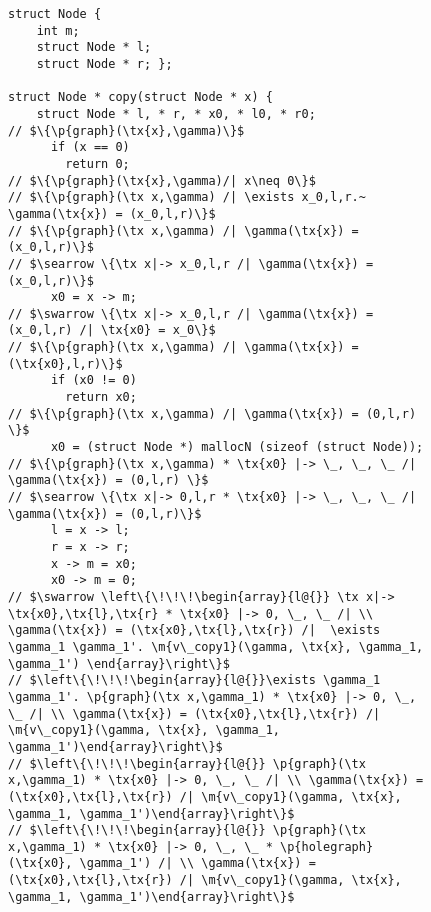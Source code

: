 \begin{figure}
  \begin{lstlisting}
struct Node {
    int m;
    struct Node * l;
    struct Node * r; };

struct Node * copy(struct Node * x) { 
    struct Node * l, * r, * x0, * l0, * r0;
// $\{\p{graph}(\tx{x},\gamma)\}$
      if (x == 0)
        return 0;
// $\{\p{graph}(\tx{x},\gamma)/| x\neq 0\}$
// $\{\p{graph}(\tx x,\gamma) /| \exists x_0,l,r.~ \gamma(\tx{x}) = (x_0,l,r)\}$
// $\{\p{graph}(\tx x,\gamma) /| \gamma(\tx{x}) = (x_0,l,r)\}$
// $\searrow \{\tx x|-> x_0,l,r /| \gamma(\tx{x}) = (x_0,l,r)\}$
      x0 = x -> m;
// $\swarrow \{\tx x|-> x_0,l,r /| \gamma(\tx{x}) = (x_0,l,r) /| \tx{x0} = x_0\}$
// $\{\p{graph}(\tx x,\gamma) /| \gamma(\tx{x}) = (\tx{x0},l,r)\}$
      if (x0 != 0)
        return x0;
// $\{\p{graph}(\tx x,\gamma) /| \gamma(\tx{x}) = (0,l,r) \}$
      x0 = (struct Node *) mallocN (sizeof (struct Node));
// $\{\p{graph}(\tx x,\gamma) * \tx{x0} |-> \_, \_, \_ /| \gamma(\tx{x}) = (0,l,r) \}$
// $\searrow \{\tx x|-> 0,l,r * \tx{x0} |-> \_, \_, \_ /| \gamma(\tx{x}) = (0,l,r)\}$
      l = x -> l;
      r = x -> r;
      x -> m = x0;
      x0 -> m = 0;
// $\swarrow \left\{\!\!\!\begin{array}{l@{}} \tx x|-> \tx{x0},\tx{l},\tx{r} * \tx{x0} |-> 0, \_, \_ /| \\ \gamma(\tx{x}) = (\tx{x0},\tx{l},\tx{r}) /|  \exists \gamma_1 \gamma_1'. \m{v\_copy1}(\gamma, \tx{x}, \gamma_1, \gamma_1') \end{array}\right\}$
// $\left\{\!\!\!\begin{array}{l@{}}\exists \gamma_1 \gamma_1'. \p{graph}(\tx x,\gamma_1) * \tx{x0} |-> 0, \_, \_ /| \\ \gamma(\tx{x}) = (\tx{x0},\tx{l},\tx{r}) /| \m{v\_copy1}(\gamma, \tx{x}, \gamma_1, \gamma_1')\end{array}\right\}$
// $\left\{\!\!\!\begin{array}{l@{}} \p{graph}(\tx x,\gamma_1) * \tx{x0} |-> 0, \_, \_ /| \\ \gamma(\tx{x}) = (\tx{x0},\tx{l},\tx{r}) /| \m{v\_copy1}(\gamma, \tx{x}, \gamma_1, \gamma_1')\end{array}\right\}$
// $\left\{\!\!\!\begin{array}{l@{}} \p{graph}(\tx x,\gamma_1) * \tx{x0} |-> 0, \_, \_ * \p{holegraph}(\tx{x0}, \gamma_1') /| \\ \gamma(\tx{x}) = (\tx{x0},\tx{l},\tx{r}) /| \m{v\_copy1}(\gamma, \tx{x}, \gamma_1, \gamma_1')\end{array}\right\}$

\end{lstlisting}
\end{figure}
